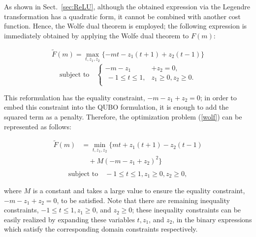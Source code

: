 \documentclass[fp,twocolumn]{jpsj3}
\begin{document}

As shown in Sect.~\ref{sec:ReLU}, although the obtained expression via the Legendre transformation has a quadratic form, it cannot be combined with another cost function.
Hence, the Wolfe dual theorem is employed;
the following expression is immediately obtained by applying the Wolfe dual theorem to $F(m)$:

\begin{eqnarray}
  \widetilde{F}(m)=\max_{t,z_{1},z_{2}} \{-mt-z_{1}(t+1)+z_{2}(t-1)\} \label{wolf}
\end{eqnarray}
\begin{equation}
  \text{subject to} \quad \left\{
  \begin{aligned}
   -m-z_{1}&+z_{2}=0, \nonumber \\
   \ -1\leq t\leq 1, & z_{1}\geq 0, z_{2}\geq 0. \nonumber \\
  \end{aligned}
  \right.
\end{equation}


This reformulation has the equality constraint, $-m-z_{1}+z_{2}=0$; in order to embed this constraint into the QUBO formulation, it is enough to add the squared term as a penalty. 
Therefore, the optimization problem (\ref{wolf}) can be represented as follows:

\begin{equation}
  \begin{aligned}
    \widetilde{F}(m)&=\min_{t,z_{1},z_{2}}{\{mt+z_{1}(t+1)-z_{2}(t-1)} \\
    &\quad+M(-m-z_{1}+z_{2})^{2}\} \label{after_wolf} \\
  \end{aligned}
\end{equation}
\begin{eqnarray}
  \text{subject to} \quad -1\leq t\leq 1, z_{1}\geq 0, z_{2}\geq 0, \nonumber
\end{eqnarray}


\noindent
where $M$ is a constant and takes a large value to ensure the equality constraint, $-m-z_{1}+z_{2}=0$, to be satisfied.
Note that there are remaining inequality constraints, $-1\leq t\leq 1, z_{1}\geq 0$, and $z_{2}\geq 0$;
these inequality constraints can be easily realized by expanding these variables $t,z_{1}$, and $z_{2}$, in the binary expressions which satisfy the corresponding domain constraints respectively.
\end{document}
